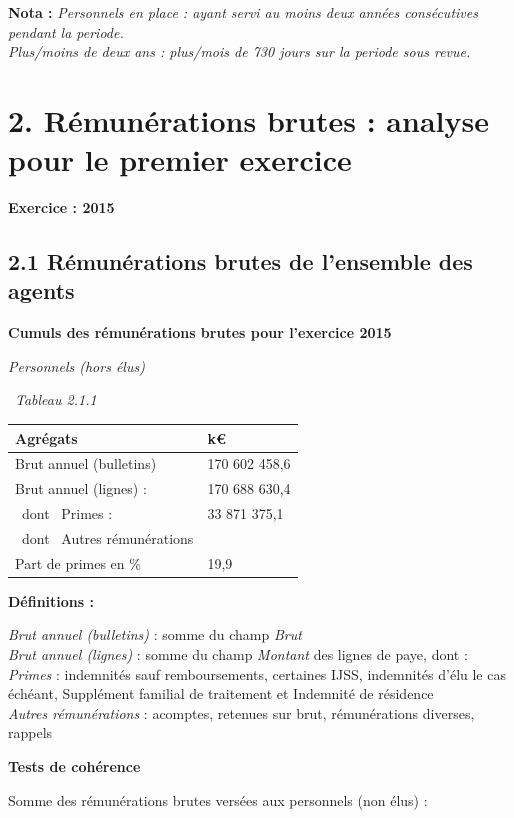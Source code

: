 \textbf{Nota :} \emph{Personnels en place : ayant servi au moins deux
années consécutives pendant la periode.}\\
\emph{Plus/moins de deux ans : plus/mois de 730 jours sur la periode
sous revue.}

\hypertarget{remunerations-brutes-analyse-pour-le-premier-exercice}{%
\section{2. Rémunérations brutes : analyse pour le premier
exercice}\label{remunerations-brutes-analyse-pour-le-premier-exercice}}

\textbf{Exercice : 2015 }

\hypertarget{remunerations-brutes-de-lensemble-des-agents}{%
\subsection{2.1 Rémunérations brutes de l'ensemble des
agents}\label{remunerations-brutes-de-lensemble-des-agents}}

\textbf{Cumuls des rémunérations brutes pour l'exercice 2015 }

\emph{Personnels (hors élus)}

~\emph{Tableau 2.1.1}

\begin{longtable}[]{@{}ll@{}}
\toprule
Agrégats & k€\tabularnewline
\midrule
\endhead
Brut annuel (bulletins) & 170 602 458,6\tabularnewline
Brut annuel (lignes) : & 170 688 630,4\tabularnewline
~dont ~Primes : & 33 871 375,1\tabularnewline
~dont ~Autres rémunérations &\tabularnewline
Part de primes en \% & 19,9\tabularnewline
\bottomrule
\end{longtable}

\textbf{Définitions :}

\emph{Brut annuel (bulletins)} : somme du champ \emph{Brut}\\
\emph{Brut annuel (lignes)} : somme du champ \emph{Montant} des lignes
de paye, dont :\\
\emph{Primes} : indemnités sauf remboursements, certaines IJSS,
indemnités d'élu le cas échéant, Supplément familial de traitement et
Indemnité de résidence\\
\emph{Autres rémunérations} : acomptes, retenues sur brut, rémunérations
diverses, rappels

\textbf{Tests de cohérence}

Somme des rémunérations brutes versées aux personnels (non élus) :

